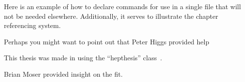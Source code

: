 \DeclareRobustCommand{\personPH}{Peter Higgs\xspace}

Here is an example of how to declare commands for use in a single file that will not be needed elsewhere.
Additionally, it serves to illustrate the chapter referencing system.

Perhaps you might want to point out that \personPH provided help

This thesis was made in \LaTeXe{} using the ``hepthesis'' class~\cite{Buckley:2010:hepthesis}.

Brian Moser provided insight on the fit.